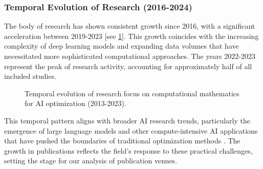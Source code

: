 \documentclass[12pt]{acm/acmart}
\begin{document}
\subsubsection{Temporal Evolution of Research (2016-2024)}\label{subsubsec:overview-of-included-studies:temporal-evolution-of-research-2016-2024}
The body of research has shown consistent growth since 2016, with a significant acceleration between 2019-2023 [see \cref{fig:temporal_evolution}]. This growth coincides with the increasing complexity of deep learning models and expanding data volumes that have necessitated more sophisticated computational approaches. The years 2022-2023 represent the peak of research activity, accounting for approximately half of all included studies.

\begin{figure}[ht]
    \centering
    \caption{Temporal evolution of research focus on computational mathematics for AI optimization (2013-2023).}
    \label{fig:temporal_evolution}
\end{figure}

This temporal pattern aligns with broader AI research trends, particularly the emergence of large language models and other compute-intensive AI applications that have pushed the boundaries of traditional optimization methods \citep{ataei2024filtering}. The growth in publications reflects the field's response to these practical challenges, setting the stage for our analysis of publication venues.
\end{document}

